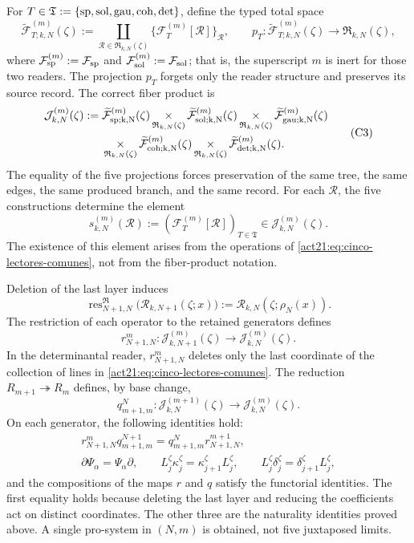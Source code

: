 For
\(T\in\mathfrak T:=\{{\rm sp},{\rm sol},{\rm gau},{\rm coh},{\rm det}\}\),
define the typed total space
\[
 \widetilde{\mathcal F}_{T;k,N}^{(m)}(\zeta)
 :=\coprod_{\mathscr R\in\mathfrak R_{k,N}(\zeta)}
   \{\mathcal F_T^{(m)}[\mathscr R]\}_{\mathscr R},
 \qquad
 p_T:\widetilde{\mathcal F}_{T;k,N}^{(m)}(\zeta)
      \longrightarrow\mathfrak R_{k,N}(\zeta),
\]
where
\(\mathcal F_{\rm sp}^{(m)}:=\mathcal F_{\rm sp}\) and
\(\mathcal F_{\rm sol}^{(m)}:=\mathcal F_{\rm sol}\); that is, the
superscript \(m\) is inert for those two readers.
The projection \(p_T\) forgets only the reader structure and preserves
its source record. The correct fiber product is
\[
\begin{aligned}
 \mathcal J_{k,N}^{(m)}(\zeta):={}&
 \widetilde{\mathcal F}_{\rm sp;k,N}^{(m)}(\zeta)
 \mathop{\times}_{\mathfrak R_{k,N}(\zeta)}
 \widetilde{\mathcal F}_{\rm sol;k,N}^{(m)}(\zeta)
 \mathop{\times}_{\mathfrak R_{k,N}(\zeta)}
 \widetilde{\mathcal F}_{\rm gau;k,N}^{(m)}(\zeta)\\
 &\mathop{\times}_{\mathfrak R_{k,N}(\zeta)}
 \widetilde{\mathcal F}_{\rm coh;k,N}^{(m)}(\zeta)
 \mathop{\times}_{\mathfrak R_{k,N}(\zeta)}
 \widetilde{\mathcal F}_{\rm det;k,N}^{(m)}(\zeta).
\end{aligned}
\tag{C3}
\label{act21:eq:constructor-correlativo}
\]
The equality of the five projections forces preservation of the same tree, the
same edges, the same produced branch, and the same record. For each
\(\mathscr R\), the five constructions determine the element
\[
 s_{k,N}^{(m)}(\mathscr R)
 :=(\mathcal F_T^{(m)}[\mathscr R])_{T\in\mathfrak T}
 \in\mathcal J_{k,N}^{(m)}(\zeta).
\]
The existence of this element arises from the operations of
\eqref{act21:eq:cinco-lectores-comunes}, not from the
fiber-product notation.

Deletion of the last layer induces
\[
 \operatorname{res}^{\mathfrak R}_{N+1,N}
 \bigl(\mathscr R_{k,N+1}(\zeta;x)\bigr)
 :=\mathscr R_{k,N}(\zeta;\rho_N(x)).
\]
The restriction of each operator to the retained generators defines
\[
 r^m_{N+1,N}:\mathcal J_{k,N+1}^{(m)}(\zeta)
 \longrightarrow\mathcal J_{k,N}^{(m)}(\zeta).
\]
In the determinantal reader, \(r^m_{N+1,N}\) deletes only the last
coordinate of the collection of lines in
\eqref{act21:eq:cinco-lectores-comunes}. The reduction
\(R_{m+1}\twoheadrightarrow R_m\) defines, by base change,
\[
 q^N_{m+1,m}:\mathcal J_{k,N}^{(m+1)}(\zeta)
 \longrightarrow\mathcal J_{k,N}^{(m)}(\zeta).
\]
On each generator, the following identities hold:
\[
\begin{gathered}
 r^m_{N+1,N}q^{N+1}_{m+1,m}
 =q^N_{m+1,m}r^{m+1}_{N+1,N},\\
 \partial\Psi_\alpha=\Psi_\alpha\partial,
 \qquad L_j^\zeta\kappa_j^\zeta
       =\kappa_{j+1}^\zeta L_j^\zeta,
 \qquad L_j^\zeta\delta_j^\zeta
       =\delta_{j+1}^\zeta L_j^\zeta,
\end{gathered}
\tag{C4}
\label{act21:eq:naturalidad-D}
\]
and the compositions of the maps \(r\) and \(q\) satisfy the functorial
identities. The first equality holds because deleting the last layer and
reducing the coefficients act on distinct coordinates. The other three
are the naturality identities proved above. A single
pro-system in \((N,m)\) is obtained, not five juxtaposed limits.

